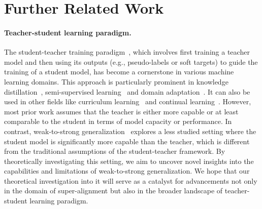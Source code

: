 \section{Further Related Work} \label{appendix:related_work}

\paragraph{Teacher-student learning paradigm.}
The student-teacher training paradigm~\citep{meseguer2019dali,meng2019conditional}, which involves first training a teacher model and then using its outputs (e.g., pseudo-labels or soft targets) to guide the training of a student model, has become a cornerstone in various machine learning domains.
This approach is particularly prominent in knowledge distillation~\citep{hinton2015distilling,beyer2022knowledge}, semi-supervised learning~\citep{tarvainen2017mean} and domain adaptation~\citep{shu2018dirt}.
It can also be used in other fields like curriculum learning~\citep{matiisen2019teacher} and continual learning~\citep{lee2021continual}.
However, most prior work assumes that the teacher is either more capable or at least comparable to the student in terms of model capacity or performance. 
In contrast, weak-to-strong generalization~\citep{burns2023weak} explores a less studied setting where the student model is significantly more capable than the teacher, which is different from the traditional assumptions of the student-teacher framework.
By theoretically investigating this setting, we aim to uncover novel insights into the capabilities and limitations of weak-to-strong generalization.
We hope that our theoretical investigation into it will serve as a catalyst for advancements not only in the domain of super-alignment but also in the broader landscape of teacher-student learning paradigm.


